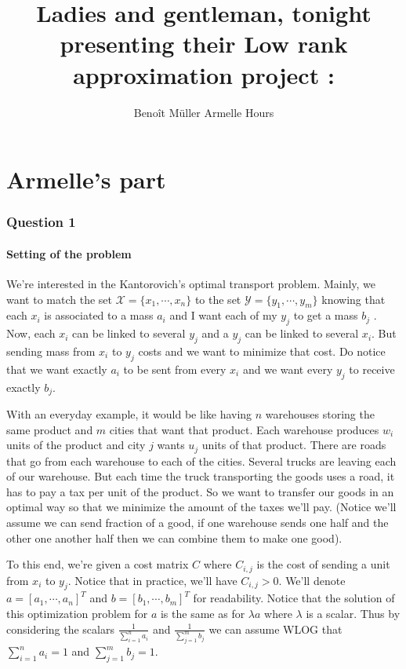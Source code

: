 \documentclass[a4paper]{article}
\title{Ladies and gentleman, tonight presenting their Low rank approximation project : }
\author{{\Huge Benoît Müller} {\Huge Armelle Hours}}
\theoremstyle{definition}
\theoremstyle{remark}
\newcommand{\X}{\mathcal{X}}
\newcommand{\Y}{\mathcal{Y}}
\begin{document}
\maketitle
\part*{Armelle's part}
\section*{Question 1}
\subsection*{Setting of the problem}
We're interested in the Kantorovich's optimal transport problem. Mainly, we want to match the set $\X=\{x_1,\cdots, x_n\}$ to the set $\Y=\{y_1,\cdots, y_m\}$ knowing that each $x_i$ is associated to a mass $a_i$ and I want each of my $y_j$ to get a mass $b_j$ . Now, each $x_i$ can be linked to several $y_j$ and a $y_j$ can be linked to several $x_i$. But sending mass from $x_i$ to $y_j$ costs and we want to minimize that cost. Do notice that we want exactly $a_i$ to be sent from every $x_i$ and we want every $y_j$ to receive exactly $b_j$.

With an everyday example, it would be like having $n$ warehouses storing the same product and $m$ cities that want that product. Each warehouse produces $w_i$ units of the product and city $j$ wants $u_j$ units of that product. There are roads that go from each warehouse to each of the cities. Several trucks are leaving each of our warehouse. But each time the truck transporting the goods uses a road, it has to pay a tax per unit of the product. So we want to transfer our goods in an optimal way so that we minimize the amount of the taxes we'll pay. (Notice we'll assume we can send fraction of a good, if one warehouse sends one half and the other one another half then we can combine them to make one good). 

To this end, we're given a cost matrix $C$ where $C_{i,j}$ is the cost of sending a unit from $x_i$ to $y_j$. Notice that in practice, we'll have $C_{i,j}>0$.  We'll denote $a=[a_1,\cdots, a_n]^T$ and $b=[b_1,\cdots, b_m]^T$ for readability. Notice that the solution of this optimization problem for $a$ is the same as for $\lambda a$ where $\lambda$ is a scalar. Thus by considering the scalars $\frac{1}{\sum\limits_{i=1}^n a_i}$ and $\frac{1}{\sum\limits_{j=1}^m b_j}$ we can assume WLOG that $\sum\limits_{i=1}^n a_i=1$ and $\sum\limits_{j=1}^m b_j=1$. 
\end{document}
